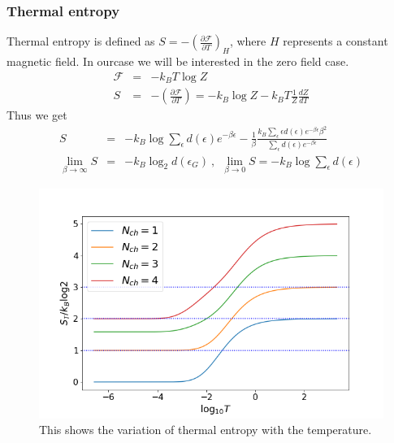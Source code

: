 \documentclass[reprint,prb,superscriptaddress]{revtex4-2}
\begin{document}
\subsubsection{Thermal entropy}
\noindent Thermal entropy is defined as $S=-(\frac{\partial \mathcal{F}}{\partial T})_H$, where $H$ represents a constant magnetic field. In ourcase we will be interested in the zero field case. 
\begin{eqnarray}
\mathcal{F}&=& -k_B T\log Z \nonumber\\
S &=& -(\frac{\partial \mathcal{F}}{\partial T}) = -k_B \log Z -k_B T \frac{1}{Z} \frac{dZ}{dT}
\end{eqnarray}
Thus we get
\begin{eqnarray}
S &=& -k_B \log \sum_{\epsilon} d(\epsilon) e^{-\beta \epsilon}  -\frac{1}{\beta} \frac{k_B\sum_\epsilon \epsilon d(\epsilon) e^{-\beta \epsilon} \beta^2   }{\sum_\epsilon  d(\epsilon)e^{-\beta \epsilon}} \nonumber\\
\lim_{\beta\rightarrow \infty} S &=& -k_B \log_2 d(\epsilon_{G})~,~~\lim_{\beta\rightarrow 0} S = -k_B \log \sum_\epsilon d(\epsilon)  \nonumber
\end{eqnarray}
\begin{figure}
\centering
\includegraphics[scale=0.36]{plt/ThermalEntanglementVS_LogTemperature_}
\caption{This shows the variation of thermal entropy with the temperature.}
\label{fig:thermal_entropy}
\end{figure}
\end{document}
